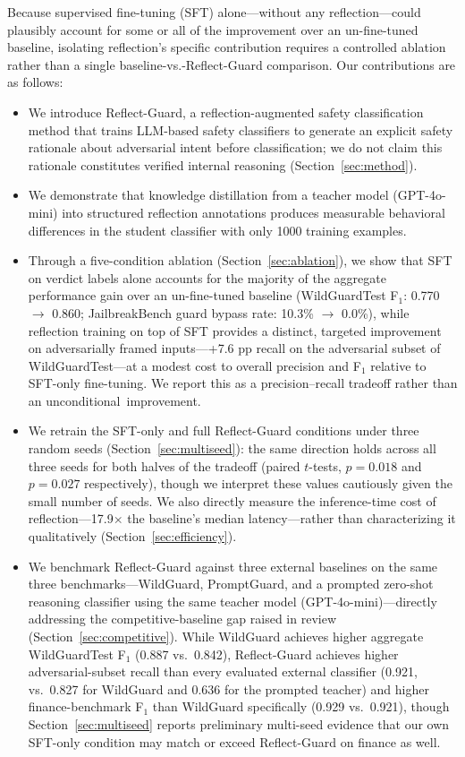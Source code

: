 \documentclass[superintelligence,article,accept,moreauthors]{Definitions/mdpi}
\begin{document}
Because supervised fine-tuning (SFT) alone---without any reflection---could plausibly account for some or all of the improvement over an un-fine-tuned baseline, isolating reflection's specific contribution requires a controlled ablation rather than a single baseline-vs.-Reflect-Guard comparison. Our contributions are as follows:
\begin{itemize}[leftmargin=*, nosep]
  \item We introduce Reflect-Guard, a reflection-augmented safety classification method that trains LLM-based safety classifiers to generate an explicit safety rationale about adversarial intent before classification; we do not claim this rationale constitutes verified internal reasoning (Section~\ref{sec:method}).
  \item We demonstrate that knowledge distillation from a teacher model (GPT-4o-mini) into structured reflection annotations produces measurable behavioral differences in the student classifier with only 1000 training examples.
  \item Through a five-condition ablation (Section~\ref{sec:ablation}), we show that SFT on verdict labels alone accounts for the majority of the aggregate performance gain over an un-fine-tuned baseline (WildGuardTest F$_1$: 0.770 $\to$ 0.860; JailbreakBench guard bypass rate: 10.3\% $\to$ 0.0\%), while reflection training on top of SFT provides a distinct, targeted improvement on adversarially framed inputs---+7.6 pp recall on the adversarial subset of WildGuardTest---at a modest cost to overall precision and F$_1$ relative to SFT-only fine-tuning. We report this as a precision--recall tradeoff rather than an \mbox{unconditional improvement.}
  \item We retrain the SFT-only and full Reflect-Guard conditions under three random seeds (Section~\ref{sec:multiseed}): the same direction holds across all three seeds for both halves of the tradeoff (paired $t$-tests, $p=0.018$ and $p=0.027$ respectively), though we interpret these values cautiously given the small number of seeds. We also directly measure the inference-time cost of reflection---17.9$\times$ the baseline's median latency---rather than characterizing it qualitatively (Section~\ref{sec:efficiency}).
  \item We benchmark Reflect-Guard against three external baselines on the same three benchmarks---WildGuard, PromptGuard, and a prompted zero-shot reasoning classifier using the same teacher model (GPT-4o-mini)---directly addressing the competitive-baseline gap raised in review (Section~\ref{sec:competitive}). While WildGuard achieves higher aggregate WildGuardTest F$_1$ (0.887 vs.\ 0.842), Reflect-Guard achieves higher adversarial-subset recall than every evaluated external classifier (0.921, vs.\ 0.827 for WildGuard and 0.636 for the prompted teacher) and higher finance-benchmark F$_1$ than WildGuard specifically (0.929 vs.\ 0.921), though Section~\ref{sec:multiseed} reports preliminary multi-seed evidence that our own SFT-only condition may match or exceed Reflect-Guard on finance as well.
\end{itemize}
\end{document}
